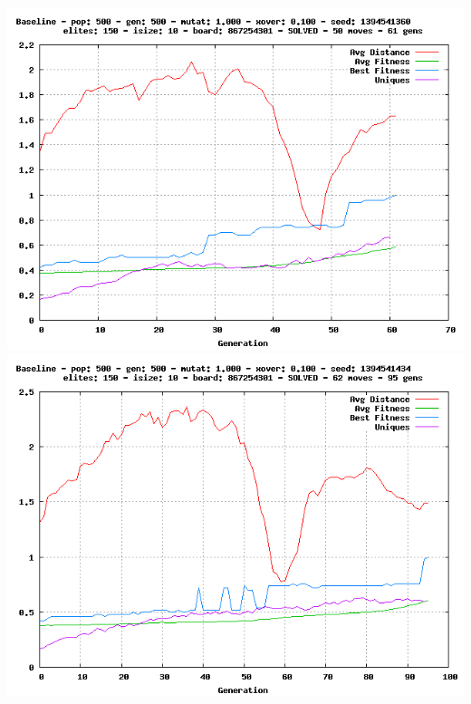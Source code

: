 \documentclass[]{article}
\begin{document}
\includegraphics{img/1.png} \includegraphics{img/2.png}
\end{document}
